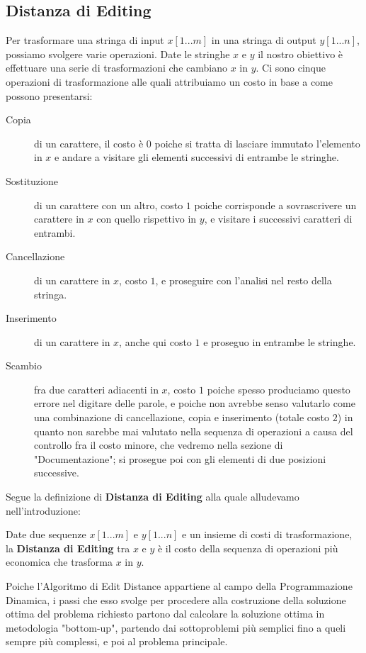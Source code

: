 \documentclass{article}
\begin{document}
\subsection{Distanza di Editing}
Per trasformare una stringa di input $x[1...m]$ in una stringa di output $y[1...n]$, possiamo svolgere varie operazioni. Date le stringhe $x$ e $y$ il nostro obiettivo è effettuare una serie di trasformazioni che cambiano $x$ in $y$. Ci sono cinque operazioni di trasformazione alle quali attribuiamo un costo in base a come possono presentarsi:
\begin{description}
\item [Copia] di un carattere, il costo è $0$ poiche si tratta di lasciare immutato l'elemento in $x$ e andare a visitare gli elementi successivi di entrambe le stringhe.
\item [Sostituzione] di un carattere con un altro, costo $1$ poiche corrisponde a sovrascrivere un carattere in $x$ con quello rispettivo in $y$, e visitare i successivi caratteri di entrambi.
\item [Cancellazione] di un carattere in $x$, costo $1$, e proseguire con l'analisi nel resto della stringa.
\item [Inserimento] di un carattere in $x$, anche qui costo $1$ e proseguo in entrambe le stringhe.
\item [Scambio] fra due caratteri adiacenti in $x$, costo $1$ poiche spesso produciamo questo errore nel digitare delle parole, e poiche non avrebbe senso valutarlo come una combinazione di cancellazione, copia e inserimento (totale costo $2$) in quanto non sarebbe mai valutato nella sequenza di operazioni a causa del controllo fra il costo minore, che vedremo nella sezione di "Documentazione"; si prosegue poi con gli elementi di due posizioni successive.
\end{description}
Segue la definizione di \textbf{Distanza di Editing} alla quale alludevamo nell'introduzione:

Date due sequenze $x[1...m]$ e $y[1...n]$ e un insieme di costi di trasformazione, la \textbf{Distanza di Editing} tra $x$ e $y$ è il costo della sequenza di operazioni più economica che trasforma $x$ in $y$. 

Poiche l'Algoritmo di Edit Distance appartiene al campo della Programmazione Dinamica, i passi che esso svolge per procedere alla costruzione della soluzione ottima del problema richiesto partono dal calcolare la soluzione ottima in metodologia "bottom-up", partendo dai sottoproblemi più semplici fino a queli sempre più complessi, e poi al problema principale.
\end{document}
